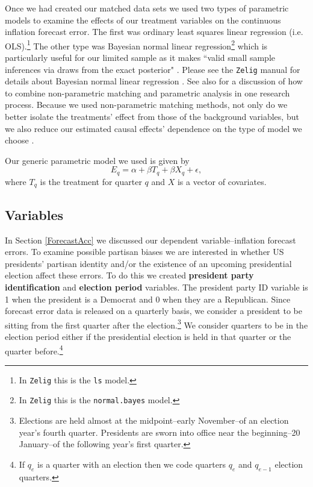 \documentclass[a4paper]{article}\usepackage{graphicx, color}
\begin{document}
Once we had created our matched data sets we used two types of parametric models to examine the effects of our treatment variables on the continuous inflation forecast error. The first was ordinary least squares linear regression (i.e. OLS).\footnote{In {\tt{Zelig}} this is the {\tt{ls}} model.} The other type was Bayesian normal linear regression\footnote{In {\tt{Zelig}} this is the {\tt{normal.bayes}} model.} which is particularly useful for our limited sample as it makes ``valid small sample inferences via draws from the exact posterior" \citep[][38]{Zelig2012}. Please see the {\tt{Zelig}} manual for details about Bayesian normal linear regression \citep{Goodrich2007}.  See also \cite{Imai2008} for a discussion of how to combine non-parametric matching and parametric analysis in one research process. Because we used non-parametric matching methods, not only do we better isolate the treatments' effect from those of the background variables, but we also reduce our estimated causal effects' dependence on the type of model we choose \cite[200--201]{Ho2007}.

Our generic parametric model we used is given by
%
\begin{equation}
    E_{q} = \alpha + \beta T_{q} + \beta X_{q} + \epsilon,
\end{equation}
%
where $T_{q}$ is the treatment for quarter $q$ and $X$ is a vector of covariates. 

\subsection{Variables}

In Section \ref{ForecastAcc} we discussed our dependent variable--inflation forecast errors. To examine possible partisan biases we are interested in whether US presidents' partisan identity and/or the existence of an upcoming presidential election affect these errors. To do this we created {\bf{president party identification}} and {\bf{election period}} variables. The president party ID variable is 1 when the president is a Democrat and 0 when they are a Republican. Since forecast error data is released on a quarterly basis, we consider a president to be sitting from the first quarter after the election.\footnote{Elections are held almost at the midpoint--early November--of an election year's fourth quarter. Presidents are sworn into office near the beginning--20 January--of the following year's first quarter.} We consider quarters to be in the election period either if the presidential election is held in that quarter or the quarter before.\footnote{If $q_{e}$ is a quarter with an election then we code quarters $q_{e}$ and $q_{e-1}$ election quarters.}
\end{document}
